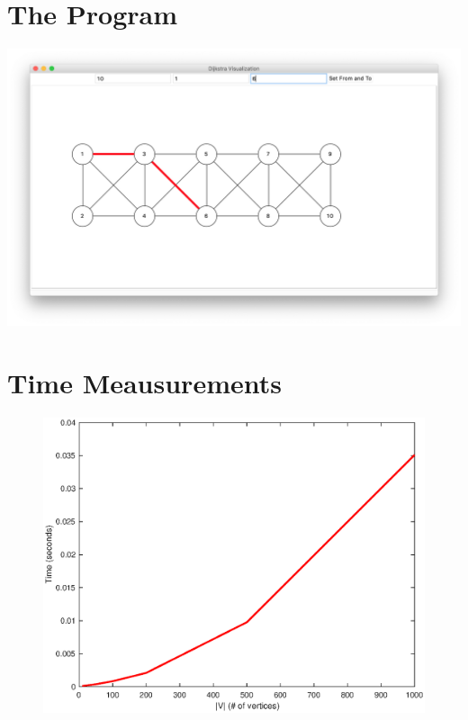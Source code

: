 \documentclass[twocolumns]{IEEEtran}
\begin{document}
	\section{The Program}
	\begin{center}
		\includegraphics[scale=.2]{main_window.png}
	\end{center}
	
	\section{Time Meausurements}
	\begin{figure}[h]
		\centering
		\includegraphics[scale=.4]{matlab/time.eps}
	\end{figure}

	
	
\end{document}
